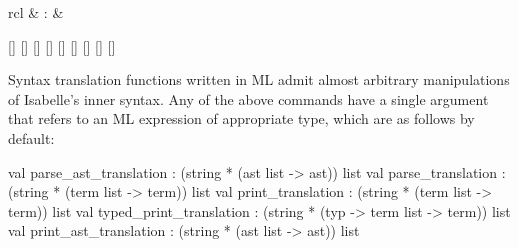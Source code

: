 \begin{isabellebody}
\begin{isamarkuptext}
\begin{matharray}{rcl}
    \hypertarget{command.print-ast-translation}{\hyperlink{command.print-ast-translation}{\mbox{}}} & : &  \\
  \end{matharray}

  \begin{railoutput}
\rail@bar
{}[]
[]
[]
[]
[]
\rail@endbar
\rail@bar
{}
[]
[]
[]
\rail@endbar
{}[]
\rail@end
\end{railoutput}


  Syntax translation functions written in ML admit almost arbitrary
  manipulations of Isabelle's inner syntax.  Any of the above commands
  have a single \hyperlink{syntax.text}{\mbox{}} argument that refers to an ML
  expression of appropriate type, which are as follows by default:

\begin{ttbox}
val parse_ast_translation   : (string * (ast list -> ast)) list
val parse_translation       : (string * (term list -> term)) list
val print_translation       : (string * (term list -> term)) list
val typed_print_translation : (string * (typ -> term list -> term)) list
val print_ast_translation   : (string * (ast list -> ast)) list
\end{ttbox}


\end{isamarkuptext}
\end{isabellebody}
